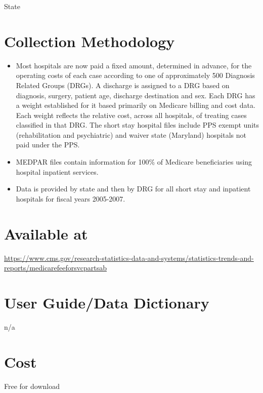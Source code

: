 \documentclass[
]{book}
\providecommand{\tightlist}{%
  \setlength{\itemsep}{0pt}\setlength{\parskip}{0pt}}
\begin{document}
State

\hypertarget{collection-methodology-38}{%
\section{Collection Methodology}\label{collection-methodology-38}}

\begin{itemize}
\tightlist
\item
  Most hospitals are now paid a fixed amount, determined in advance, for the operating costs of each case according to one of approximately 500 Diagnosis Related Groups (DRGs). A discharge is assigned to a DRG based on diagnosis, surgery, patient age, discharge destination and sex. Each DRG has a weight established for it based primarily on Medicare billing and cost data. Each weight reflects the relative cost, across all hospitals, of treating cases classified in that DRG. The short stay hospital files include PPS exempt units (rehabilitation and psychiatric) and waiver state (Maryland) hospitals not paid under the PPS.
\item
  MEDPAR files contain information for 100\% of Medicare beneficiaries using hospital inpatient services.
\item
  Data is provided by state and then by DRG for all short stay and inpatient hospitals for fiscal years 2005-2007.
\end{itemize}

\hypertarget{available-at-38}{%
\section{Available at}\label{available-at-38}}

\url{https://www.cms.gov/research-statistics-data-and-systems/statistics-trends-and-reports/medicarefeeforsvcpartsab}

\hypertarget{user-guidedata-dictionary-38}{%
\section{User Guide/Data Dictionary}\label{user-guidedata-dictionary-38}}

n/a

\hypertarget{cost-38}{%
\section{Cost}\label{cost-38}}

Free for download
\end{document}
